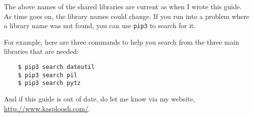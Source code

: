 The above names of the shared libraries are current as when I wrote
this guide. As time goes on, the library names could change. If
you run into a problem where a library name was not found, you
can use \texttt{pip3} to search for it.

For example, here are three commands to help you search from the
three main libraries that are needed:

\begin{verbatim}
    $ pip3 search dateutil
    $ pip3 search pil
    $ pip3 search pytz
\end{verbatim}

And if this guide is out of date, do let me know via my website,
\url{http://www.kasploosh.com/}.
